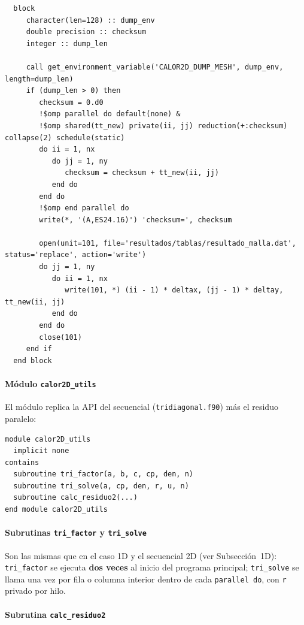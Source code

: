 \documentclass[11pt,a4paper]{article}
\begin{document}
\begin{verbatim}
  block
     character(len=128) :: dump_env
     double precision :: checksum
     integer :: dump_len

     call get_environment_variable('CALOR2D_DUMP_MESH', dump_env, length=dump_len)
     if (dump_len > 0) then
        checksum = 0.d0
        !$omp parallel do default(none) &
        !$omp shared(tt_new) private(ii, jj) reduction(+:checksum) collapse(2) schedule(static)
        do ii = 1, nx
           do jj = 1, ny
              checksum = checksum + tt_new(ii, jj)
           end do
        end do
        !$omp end parallel do
        write(*, '(A,ES24.16)') 'checksum=', checksum

        open(unit=101, file='resultados/tablas/resultado_malla.dat', status='replace', action='write')
        do jj = 1, ny
           do ii = 1, nx
              write(101, *) (ii - 1) * deltax, (jj - 1) * deltay, tt_new(ii, jj)
           end do
        end do
        close(101)
     end if
  end block
\end{verbatim}


\paragraph{M\'odulo \texttt{calor2D\_utils}}

\medskip

El m\'odulo replica la API del secuencial (\texttt{tridiagonal.f90}) m\'as el
residuo paralelo:

\begin{verbatim}
module calor2D_utils
  implicit none
contains
  subroutine tri_factor(a, b, c, cp, den, n)
  subroutine tri_solve(a, cp, den, r, u, n)
  subroutine calc_residuo2(...)
end module calor2D_utils
\end{verbatim}

\paragraph{Subrutinas \texttt{tri\_factor} y \texttt{tri\_solve}}
\medskip

Son las mismas que en el caso 1D y el secuencial 2D (ver
Subsecci\'on~1D): \texttt{tri\_factor} se ejecuta \textbf{dos veces} al inicio del programa principal; \texttt{tri\_solve} se llama una vez por fila o columna interior dentro de cada \texttt{parallel do}, con \texttt{r} privado por hilo.

\paragraph{Subrutina \texttt{calc\_residuo2}}
\medskip
\end{document}
